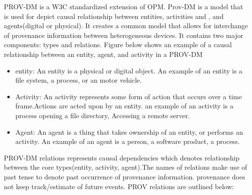 PROV-DM is a W3C standardized extension of OPM. Prov-DM is a model that is used for depict causal relationship between entities, activities and , and agents(digital or physical).  It creates a common model that allows for interchange of provenance information between heterogeneous devices. It contains two major components: types and relations. Figure below shows an example of a causal relationship between an entity, agent, and activity in a PROV-DM

\begin{itemize}

\item entity: An entity is a physical or digital object. An example of an entity is a file system, a process, or an motor vehicle.

\item Activity: An activity represents some form of action that occurs over a time frame.Actions are acted upon by an entity. an example of an activity is a process opening a file directory, Accessing a remote server.

\item Agent: An agent is a thing that takes ownership of an entity, or performs an activity. An example of an agent is a person, a software product, a process.
\end{itemize}

PROV-DM relations represents causal dependencies which denotes relationship between the core types(entity, activity, agent).The names of relations make use of past tense to denote past occurrence of provenance information. provenance does not keep track/estimate of future events. PROV relations are outlined below:


